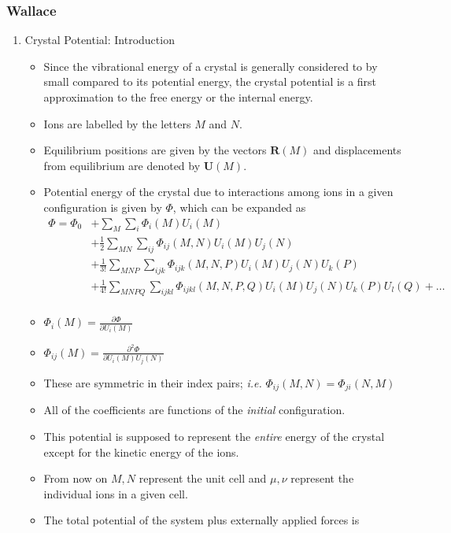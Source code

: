 \documentclass[11pt]{article}
\begin{document}
\subsubsection{Wallace}
\label{sec:org3a222b2}
\begin{enumerate}
\item Crystal Potential: Introduction
\label{sec:org3f8e3c0}
\begin{itemize}
\item Since the vibrational energy of a crystal is generally considered to by
small compared to its potential energy, the crystal potential is a first
approximation to the free energy or the internal energy.
\item Ions are labelled by the letters \(M\) and \(N\).
\item Equilibrium positions are given by the vectors \(\mathbf{R}(M)\) and
displacements from equilibrium are denoted by \(\mathbf{U}(M)\).
\item Potential energy of the crystal due to interactions among ions in a
given configuration is given by \(\Phi\), which can be expanded as
\begin{align}
\Phi = \Phi_{0} &+ \sum_{M}\sum_{i} \Phi_{i}(M)U_{i}(M) \\ 
     &+ \frac{1}{2}\sum_{MN}\sum_{ij}\Phi_{ij}(M,N)U_i(M)U_j(N)\\ 
     &+ \frac{1}{3!} \sum_{MNP}\sum_{ijk}\Phi_{ijk}(M,N,P)U_{i}(M)U_{j}(N)U_{k}(P) \\
     &+ \frac{1}{4!} \sum_{MNPQ}\sum_{ijkl}\Phi_{ijkl}(M,N,P,Q)U_{i}(M)U_{j}(N)U_{k}(P)U_{l}(Q) + \dots \\
\end{align}
\item \(\Phi_{i}(M) = \frac{\partial \Phi}{\partial U_{i}(M)}\)
\item \(\Phi_{ij}(M) = \frac{\partial^{2} \Phi}{\partial U_{i}(M)U_{j}(N)}\)
\item These are symmetric in their index pairs; \emph{i.e.} \(\Phi_{ij}(M,N) = \Phi_{ji}(N,M)\)
\item All of the coefficients are functions of the \emph{initial} configuration.
\item This potential is supposed to represent the \emph{entire} energy of the crystal
except for the kinetic energy of the ions.
\item From now on \(M, N\) represent the unit cell and \(\mu, \nu\) represent the
individual ions in a given cell.
\item The total potential of the system plus externally applied forces is

\end{itemize}
\end{enumerate}
\end{document}

